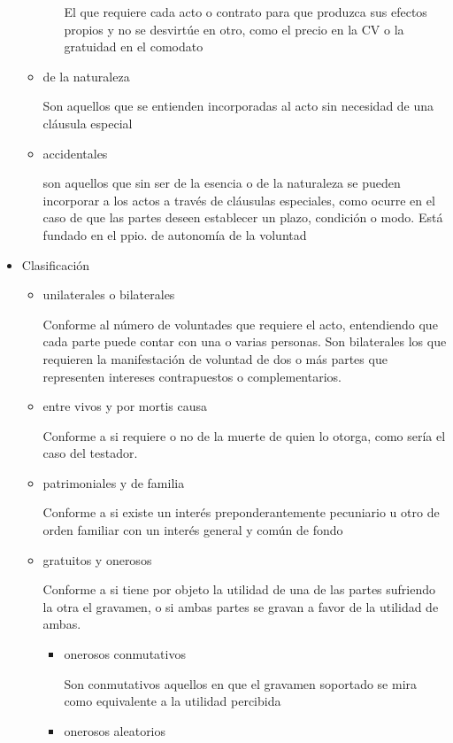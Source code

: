 \documentclass[]{article}
\begin{document}
\begin{itemize}
\begin{itemize}
\begin{itemize}
      El que requiere cada acto o contrato para que produzca sus efectos
      propios y no se desvirtúe en otro, como el precio en la CV o la
      gratuidad en el comodato
    \end{itemize}
  \item
    de la naturaleza

    Son aquellos que se entienden incorporadas al acto sin necesidad de
    una cláusula especial
  \item
    accidentales

    son aquellos que sin ser de la esencia o de la naturaleza se pueden
    incorporar a los actos a través de cláusulas especiales, como ocurre
    en el caso de que las partes deseen establecer un plazo, condición o
    modo. Está fundado en el ppio. de autonomía de la voluntad
  \end{itemize}
\item
  Clasificación

  \begin{itemize}
  \item
    unilaterales o bilaterales

    Conforme al número de voluntades que requiere el acto, entendiendo
    que cada parte puede contar con una o varias personas. Son
    bilaterales los que requieren la manifestación de voluntad de dos o
    más partes que representen intereses contrapuestos o
    complementarios.
  \item
    entre vivos y por mortis causa

    Conforme a si requiere o no de la muerte de quien lo otorga, como
    sería el caso del testador.
  \item
    patrimoniales y de familia

    Conforme a si existe un interés preponderantemente pecuniario u otro
    de orden familiar con un interés general y común de fondo
  \item
    gratuitos y onerosos

    Conforme a si tiene por objeto la utilidad de una de las partes
    sufriendo la otra el gravamen, o si ambas partes se gravan a favor
    de la utilidad de ambas.

    \begin{itemize}
    \item
      onerosos conmutativos

      Son conmutativos aquellos en que el gravamen soportado se mira
      como equivalente a la utilidad percibida
    \item
      onerosos aleatorios


\end{itemize}
\end{itemize}
\end{itemize}
\end{document}

